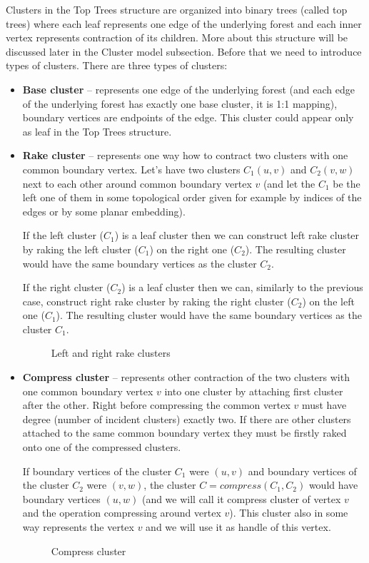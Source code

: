 Clusters in the Top Trees structure are organized into binary trees (called
{\I top trees}) where each leaf represents one edge of the underlying forest and
each inner vertex represents contraction of its children. More about this
structure will be discussed later in the {\I Cluster model} subsection. Before
that we need to introduce types of clusters. There are three types of clusters:
\begin{itemize}

\item {\bf Base cluster} -- represents one edge of the underlying forest (and
each edge of the underlying forest has exactly one base cluster, it is 1:1 mapping),
boundary vertices are endpoints of the edge.
This cluster could appear only as leaf in the Top Trees structure.

\item {\bf Rake cluster} -- represents one way how to contract two clusters
with one common boundary vertex. Let's have two clusters $C_1(u,v)$ and
$C_2(v,w)$ next to each other around common boundary vertex $v$ (and let the
$C_1$ be the left one of them in some topological order given for example by
indices of the edges or by some planar embedding).

If the left cluster ($C_1$) is a leaf cluster then we can construct {\I left
rake cluster} by {\I raking} the left cluster ($C_1$) on the right one ($C_2$).
The resulting cluster would have the same boundary vertices as the cluster $C_2$.

If the right cluster ($C_2$) is a leaf cluster then we can, similarly to the
previous case, construct {\I right rake cluster} by {\I raking} the right
cluster ($C_2$) on the left one ($C_1$). The resulting cluster would have the
same boundary vertices as the cluster $C_1$.

\begin{figure}[h]
\centering
{}
\caption{Left and right rake clusters}
\end{figure}

\item{\bf Compress cluster} -- represents other contraction of the two clusters
with one common boundary vertex $v$ into one cluster by attaching first cluster
after the other. Right before compressing the common vertex $v$ must have degree
(number of incident clusters) exactly two. If there are other clusters attached
to the same common boundary vertex they must be firstly {\I raked} onto one of
the compressed clusters.

If boundary vertices of the cluster $C_1$ were $(u,v)$ and boundary vertices
of the cluster $C_2$ were $(v,w)$, the cluster $C=compress(C_1,C_2)$ would have
boundary vertices $(u,w)$ (and we will call it {\I compress cluster
of vertex $v$} and the operation {\I compressing around vertex $v$}).
This cluster also in some way represents the vertex $v$ and we will use it as
{\I handle} of this vertex.

\begin{figure}[H]
\centering
{}
\caption{Compress cluster}
\end{figure}

\end{itemize}

